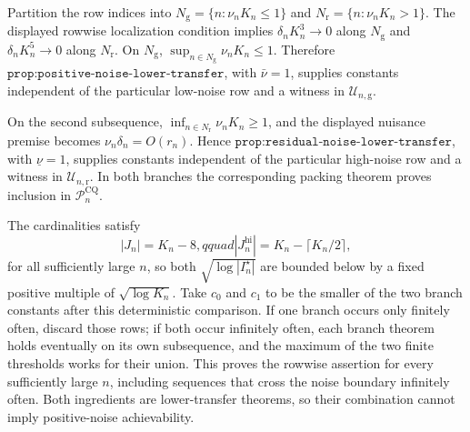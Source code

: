 Partition the row indices into \(N_{\mathrm g}=\{n:\nu_nK_n\leq1\}\) and \(N_{\mathrm r}=\{n:\nu_nK_n>1\}\).  The displayed rowwise localization condition implies \(\delta_nK_n^3\to0\) along \(N_{\mathrm g}\) and \(\delta_nK_n^5\to0\) along \(N_{\mathrm r}\).  On \(N_{\mathrm g}\), \(\sup_{n\in N_{\mathrm g}}\nu_nK_n\leq1\).  Therefore \(\texttt{prop:positive-noise-lower-transfer}\), with \(\bar\nu=1\), supplies constants independent of the particular low-noise row and a witness in \(\mathcal U_{n,\mathrm g}\).

On the second subsequence, \(\inf_{n\in N_{\mathrm r}}\nu_nK_n\geq1\), and the displayed nuisance premise becomes \(\nu_n\delta_n=O(r_n)\).  Hence \(\texttt{prop:residual-noise-lower-transfer}\), with \(\underline\nu=1\), supplies constants independent of the particular high-noise row and a witness in \(\mathcal U_{n,\mathrm r}\).  In both branches the corresponding packing theorem proves inclusion in \(\mathcal P_n^{\mathrm{CQ}}\).

The cardinalities satisfy
\[
 |J_n|=K_n-8,qquad |J_n^{\mathrm{hi}}|=K_n-\lceil K_n/2\rceil,
\]
for all sufficiently large \(n\), so both \(\sqrt{\log|I_n^\star|}\) are bounded below by a fixed positive multiple of \(\sqrt{\log K_n}\).  Take \(c_0\) and \(c_1\) to be the smaller of the two branch constants after this deterministic comparison.  If one branch occurs only finitely often, discard those rows; if both occur infinitely often, each branch theorem holds eventually on its own subsequence, and the maximum of the two finite thresholds works for their union.  This proves the rowwise assertion for every sufficiently large \(n\), including sequences that cross the noise boundary infinitely often.  Both ingredients are lower-transfer theorems, so their combination cannot imply positive-noise achievability.